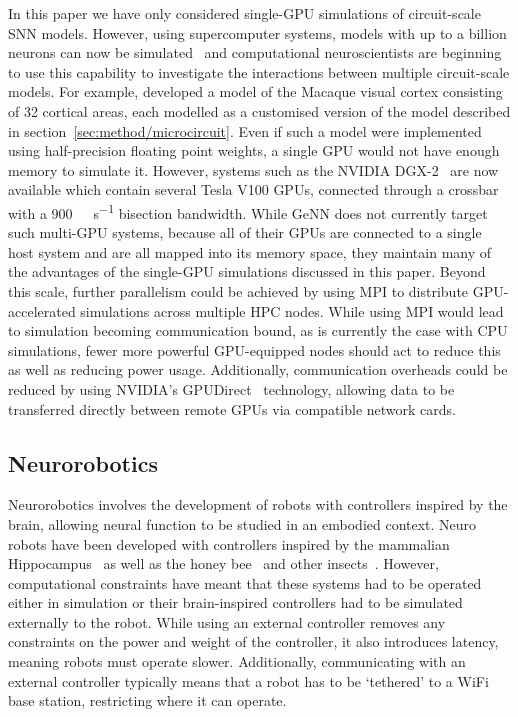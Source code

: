 \documentclass[utf8]{frontiersSCNS} %
\begin{document}
In this paper we have only considered single-GPU simulations of circuit-scale SNN models.
However, using supercomputer systems, models with up to a billion neurons can now be simulated~\citep{Jordan2018} and computational neuroscientists are beginning to use this capability to investigate the interactions between multiple circuit-scale models.
For example, \citet{Schmidt2015} developed a model of the Macaque visual cortex consisting of 32 cortical areas, each modelled as a customised version of the model described in section~\ref{sec:method/microcircuit}.
Even if such a model were implemented using half-precision floating point weights, a single GPU would not have enough memory to simulate it.
However, systems such as the NVIDIA DGX-2~\citep{NVIDIACorporation2018b} are now available which contain several Tesla V100 GPUs, connected through a crossbar with a \SI{900}{\giga\byte\per\second} bisection bandwidth.
While GeNN does not currently target such multi-GPU systems, because all of their GPUs are connected to a single host system and are all mapped into its memory space, they maintain many of the advantages of the single-GPU simulations discussed in this paper.
Beyond this scale, further parallelism could be achieved by using MPI to distribute GPU-accelerated simulations across multiple HPC nodes.
While using MPI would lead to simulation becoming communication bound, as is currently the case with CPU simulations, fewer more powerful GPU-equipped nodes should act to reduce this as well as reducing power usage. 
Additionally, communication overheads could be reduced by using NVIDIA's GPUDirect~\citep{NVIDIACorporation2018c} technology, allowing data to be transferred directly between remote GPUs via compatible network cards.

\subsection{Neurorobotics}
\label{sec:discussion/neurobotics}
Neurorobotics involves the development of robots with controllers inspired by the brain, allowing neural function to be studied in an embodied context.
Neuro robots have been developed with controllers inspired by the mammalian Hippocampus~\citep{Krichmar2005} as well as the honey bee~\citep{Cope2016} and other insects~\citep{Blanchard2000}.
However, computational constraints have meant that these systems had to be operated either in simulation or their brain-inspired controllers had to be simulated externally to the robot.
While using an external controller removes any constraints on the power and weight of the controller, it also introduces latency, meaning robots must operate slower.
Additionally, communicating with an external controller typically means that a robot has to be `tethered' to a WiFi base station, restricting where it can operate.
\end{document}
